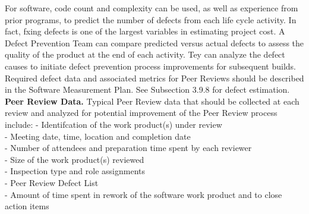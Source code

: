 \documentclass[twocolumn,a4paper,13pt]{book}
\begin{document}
For software, code count and complexity can be used, as well
as experience from prior programs, to predict the number of
defects from each life cycle activity. In fact, fxing defects is
one of the largest variables in estimating project cost.
A Defect Prevention Team can compare predicted versus
actual defects to assess the quality of the product at the end
of each activity. Tey can analyze the defect causes to initiate defect prevention process improvements for subsequent
builds. Required defect data and associated metrics for Peer
Reviews should be described in the Software Measurement
Plan. See Subsection 3.9.8 for defect estimation.
\textbf{Peer Review Data.} Typical Peer Review data that
should be collected at each review and analyzed for potential
improvement of the Peer Review process include:
- Identifcation of the work product(s) under review\\
- Meeting date, time, location and completion date\\
- Number of attendees and preparation time spent by
each reviewer\\
- Size of the work product(s) reviewed\\
- Inspection type and role assignments\\
- Peer Review Defect List\\
- Amount of time spent in rework of the software work
product and to close action items
\end{document}
